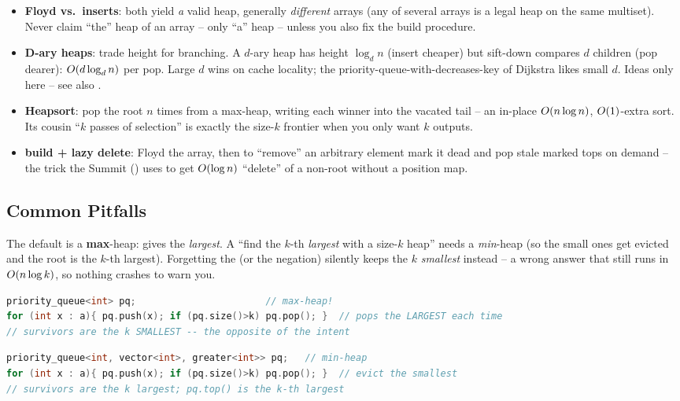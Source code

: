 \begin{itemize}[nosep]
  \item \textbf{Floyd vs.\ inserts}: both yield \emph{a} valid heap, generally \emph{different} arrays (any
        of several arrays is a legal heap on the same multiset). Never claim ``the'' heap of an array --
        only ``a'' heap -- unless you also fix the build procedure. \hfill{}
  \item \textbf{D-ary heaps}: trade height for branching. A $d$-ary heap has height $\log_d n$ (insert
        cheaper) but sift-down compares $d$ children (pop dearer): $O(d\log_d n)$ per pop. Large $d$
        wins on cache locality; the priority-queue-with-decreases-key of Dijkstra likes small $d$. Ideas
        only here -- see also . \hfill{}
  \item \textbf{Heapsort}: pop the root $n$ times from a max-heap, writing each winner into the vacated
        tail -- an in-place $O(n\log n)$, $O(1)$-extra sort. Its cousin ``$k$ passes of selection''
        is exactly the size-$k$ frontier when you only want $k$ outputs. \hfill{}
  \item \textbf{build + lazy delete}: Floyd the array, then to ``remove'' an arbitrary element mark it dead
        and pop stale marked tops on demand -- the trick the Summit () uses to get
        $O(\log n)$ ``delete'' of a non-root without a position map. \hfill{}
\end{itemize}

\subsection{Common Pitfalls}

\begin{warningbox}
The default  is a \textbf{max}-heap:  gives the \emph{largest}. A
``find the $k$-th \emph{largest} with a size-$k$ heap'' needs a \emph{min}-heap (so the small ones get
evicted and the root is the $k$-th largest). Forgetting the  (or the negation) silently
keeps the $k$ \emph{smallest} instead -- a wrong answer that still runs in $O(n\log k)$, so nothing
crashes to warn you.
\end{warningbox}
\begin{lstlisting}[caption={\textcolor{warningred}{WRONG}: default (max) heap for ``top k largest'' keeps the k smallest}, language=C++, basicstyle=\ttfamily\small]
priority_queue<int> pq;                       // max-heap!
for (int x : a){ pq.push(x); if (pq.size()>k) pq.pop(); }  // pops the LARGEST each time
// survivors are the k SMALLEST -- the opposite of the intent
\end{lstlisting}
\begin{lstlisting}[caption={\textcolor{successgreen}{RIGHT}: a size-k MIN-heap keeps the k largest}, language=C++, basicstyle=\ttfamily\small]
priority_queue<int, vector<int>, greater<int>> pq;   // min-heap
for (int x : a){ pq.push(x); if (pq.size()>k) pq.pop(); }  // evict the smallest
// survivors are the k largest; pq.top() is the k-th largest
\end{lstlisting}


